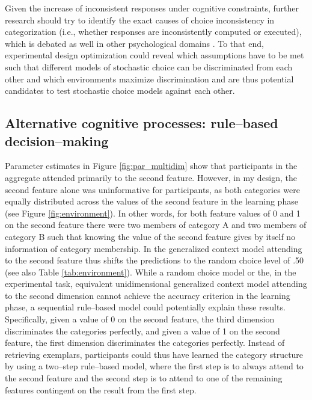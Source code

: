 \documentclass[a4paper,man,natbib]{apa6}
\begin{document}
Given the increase of inconsistent responses under cognitive constraints, further research should try to identify the exact causes of choice inconsistency in categorization (i.e., whether responses are inconsistently computed or executed), which is debated as well in other psychological domains \citep{blavatskyy2010models}. To that end, experimental design optimization \citep{myung2004model} could reveal which assumptions have to be met such that different models of stochastic choice can be discriminated from each other and which environments maximize discrimination and are thus potential candidates to test stochastic choice models against each other.

\subsection{Alternative cognitive processes: rule--based decision--making}
Parameter estimates in Figure \ref{fig:par_multidim} show that participants in the aggregate attended primarily to the second feature. However, in my design, the second feature alone was uninformative for participants, as both categories were equally distributed across the values of the second feature in the learning phase (see Figure \ref{fig:environment}). In other words, for both feature values of 0 and 1 on the second feature there were two members of category A and two members of category B such that knowing the value of the second feature gives by itself no information of category membership. In the generalized context model attending to the second feature thus shifts the predictions to the random choice level of .50 (see also Table \ref{tab:environment}). While a random choice model or the, in the experimental task, equivalent unidimensional generalized context model attending to the second dimension cannot achieve the accuracy criterion in the learning phase, a sequential rule--based model could potentially explain these results. 
Specifically, given a value of 0 on the second feature, the third dimension discriminates the categories perfectly, and given a value of 1 on the second feature, the first dimension discriminates the categories perfectly. Instead of retrieving exemplars, participants could thus have learned the category structure by using a two--step rule--based model, where the first step is to always attend to the second feature and the second step is to attend to one of the remaining features contingent on the result from the first step.
\end{document}

